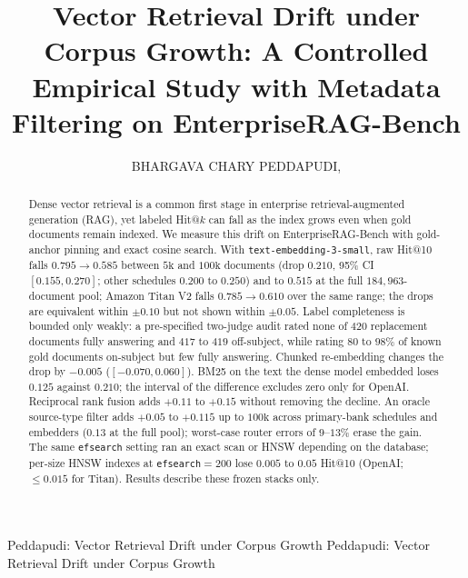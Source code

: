 \documentclass{ieeeaccess}
\makeatletter
\DeclareRobustCommand{\_}{\ifmmode\nfss@text{\textunderscore}\else\textunderscore\allowbreak\fi}
\makeatother
\begin{document}

\title{Vector Retrieval Drift under Corpus Growth: A Controlled Empirical Study with Metadata Filtering on EnterpriseRAG-Bench}

\author{\uppercase{Bhargava Chary Peddapudi},
}
\address[1]{Independent Researcher, San Francisco Bay Area, CA, USA (e-mail: pedapudibhargav@gmail.com)}

\markboth
{Peddapudi: Vector Retrieval Drift under Corpus Growth}
{Peddapudi: Vector Retrieval Drift under Corpus Growth}

\begin{abstract}
Dense vector retrieval is a common first stage in enterprise retrieval-augmented generation (RAG), yet labeled Hit@$k$ can fall as the index grows even when gold documents remain indexed. We measure this drift on EnterpriseRAG-Bench with gold-anchor pinning and exact cosine search. With \texttt{text-embedding-3-small}, raw Hit@10 falls $0.795{\to}0.585$ between $5\text{k}$ and $100\text{k}$ documents (drop $0.210$, 95\% CI $[0.155,0.270]$; other schedules $0.200$ to $0.250$) and to $0.515$ at the full $184{,}963$-document pool; Amazon Titan V2 falls $0.785{\to}0.610$ over the same range; the drops are equivalent within $\pm0.10$ but not shown within $\pm0.05$. Label completeness is bounded only weakly: a pre-specified two-judge audit rated none of $420$ replacement documents fully answering and $417$ to $419$ off-subject, while rating $80$ to $98\%$ of known gold documents on-subject but few fully answering. Chunked re-embedding changes the drop by $-0.005$ ($[-0.070,0.060]$). BM25 on the text the dense model embedded loses $0.125$ against $0.210$; the interval of the difference excludes zero only for OpenAI. Reciprocal rank fusion adds $+0.11$ to $+0.15$ without removing the decline. An oracle source-type filter adds $+0.05$ to $+0.115$ up to $100\text{k}$ across primary-bank schedules and embedders ($0.13$ at the full pool); worst-case router errors of $9$--$13\%$ erase the gain. The same \texttt{ef\_search} setting ran an exact scan or HNSW depending on the database; per-size HNSW indexes at \texttt{ef\_search}${=}200$ lose $0.005$ to $0.05$ Hit@10 (OpenAI; ${\le}0.015$ for Titan). Results describe these frozen stacks only.
\end{abstract}
\end{document}
